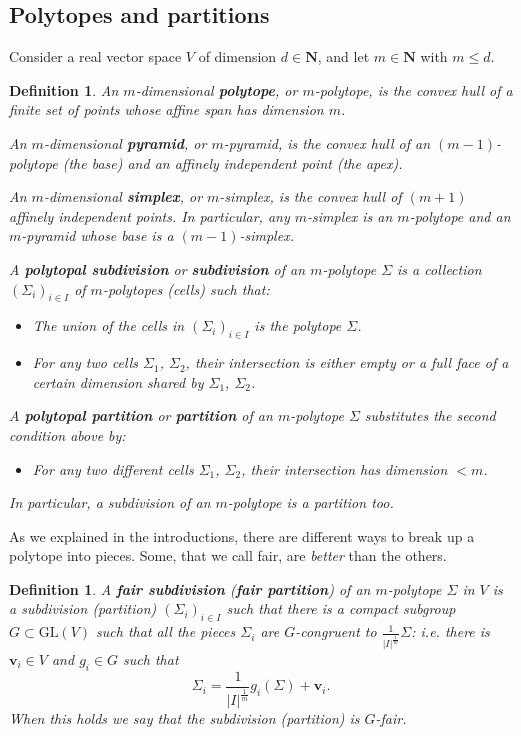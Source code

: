 \documentclass[10pt]{amsart}
\newcommand{\N}{\mathbf{N}}
\newtheorem{definition}[theorem]{Definition}
\begin{document}
\subsection{Polytopes and partitions}
Consider a real vector space $V$ of dimension $d\in \N$, and let $m\in \N$ with $m\leq d$.
\begin{definition}
An $m$-dimensional {\bf polytope}, or $m$-polytope, is the convex hull of a finite set of points whose affine span has dimension $m$. 

 An $m$-dimensional {\bf pyramid}, or $m$-pyramid, is the convex hull of an $(m-1)$-polytope (the \emph{base}) and an affinely independent point (the \emph{apex}).
 
 An $m$-dimensional {\bf simplex}, or $m$-simplex, is the convex hull of $(m+1)$ affinely independent points. In particular, any $m$-simplex is an $m$-polytope and an $m$-pyramid whose base is a $(m-1)$-simplex. 

A {\bf polytopal subdivision} or {\bf subdivision} of an $m$-polytope $\Sigma$ is a collection $(\Sigma_i)_{i\in I}$ of $m$-polytopes (\emph{cells}) such that:
\begin{itemize}
    \item The union of the cells in $(\Sigma_i)_{i\in I}$ is the polytope $\Sigma$.
    \item For any two cells $\Sigma_1$, $\Sigma_2$, their intersection is either empty or a full face of a certain dimension shared by $\Sigma_1$, $\Sigma_2$.
\end{itemize}
A {\bf polytopal partition} or {\bf partition} of an $m$-polytope $\Sigma$ substitutes the second condition above by:
\begin{itemize}
    \item  For any two different cells $\Sigma_1$, $\Sigma_2$, their intersection has dimension $<m$.
\end{itemize}
In particular, a subdivision of an $m$-polytope is a partition too.
\end{definition}

As we explained in the introductions, there are different ways to break up a polytope into pieces. Some, that we call fair, are \emph{better} than the others.
\begin{definition} A {\bf fair subdivision} ({\bf fair partition}) of an $m$-polytope $\Sigma$ in $V$ is a subdivision (partition) $(\Sigma_i)_{i \in I}$ such that there is a compact subgroup $G \subset \mathrm{GL}(V)$ such that all the pieces $\Sigma_i$ are $G$-congruent to $\frac{1}{|I|^{\frac{1}{m}}}\Sigma$: i.e. there is $\mathbf{v}_i \in V$ and $g_i \in G$ such that
\begin{equation}\label{eq:G-congruence}\Sigma_i = \frac{1}{|I|^{\frac{1}{m}}} g_i(\Sigma) + \mathbf{v}_i.
\end{equation}
When this holds we say that the subdivision (partition) is $G$-fair.
\end{definition}
\end{document}
